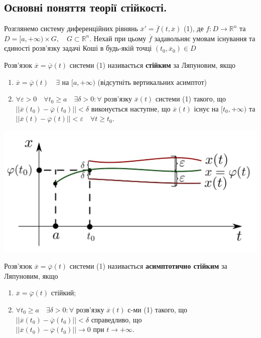 \documentclass[14pt,a4paper]{scrartcl}
\theoremstyle{definition}
\theoremstyle{definition}
\theoremstyle{definition}
\begin{document}
\subsection{Основні поняття теорії стійкості.}
Розглянемо систему диференційних рівнянь $\overline{x}' = \overline{f}(t, \overline{x})$ (1), де $f : D \rightarrow \mathbb{R}^n$ та $D = [a, +\infty) \times G, \quad G \subset \mathbb{R}^n$. Нехай при цьому $\overline{f}$ задавольняє умовам існування та єдиності розв'язку задачі Коші в будь-якій точці $(t_0, \overline{x}_0) \in D$

\bd
Розв'язок $\overline{x} = \overline{\varphi}(t)$ системи (1) називається \textbf{стійким} за Ляпуновим, якщо

\begin{enumerate}
  \item $\overline{x} = \overline{\varphi}(t) \quad \exists  \text{ на } [a, +\infty)$ (відсутніть вертикальних асимптот)
  \item $\forall \varepsilon > 0 \quad \forall t_0 \geq a \quad \exists \delta > 0 : \forall $ розв'язку $\overline{x}(t)$ системи (1) такого, що $||\overline{x}(t_0) - \overline{\varphi}(t_0)|| < \delta$ виконується наступне, що $\overline{x}(t)$ існує на $[t_0, +\infty)$ та $||\overline{x}(t) - \overline{\varphi}(t)|| < \varepsilon \quad \forall t \geq t_0$.
\end{enumerate}
\ed

\begin{center} \includegraphics[scale=0.35]{assets/lect1.jpg} \end{center}

\bd
Розв'язок $\overline{x} = \overline{\varphi}(t)$ системи (1) називається \textbf{асимптотично стійким} за Ляпуновим, якщо

\begin{enumerate}
  \item $\overline{x} = \overline{\varphi}(t)$ стійкий;
  \item $\forall t_0 \geq a \quad \exists \delta > 0: \forall$ розв'язку $\overline{x}(t)$ с-ми (1) такого, що $||\overline{x}(t_0) - \overline{\varphi}(t_0)|| < \delta$ справедливо, що $||\overline{x}(t_0) - \overline{\varphi}(t_0)|| \rightarrow 0 \text{ при } t \rightarrow + \infty$.
\end{enumerate}
\end{document}
